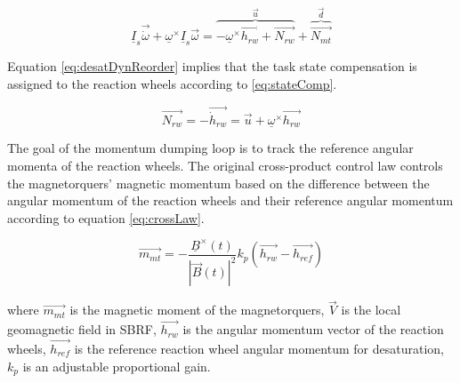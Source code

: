 \begin{equation}
\underline I_{s} \vec{\dot{\omega}} + \underline{\omega}^\times\underline I_{s} \vec{\omega} =    \overbrace{-\underline{\omega}^\times\vec{h_{rw}} + \vec{N_{rw}}}^{\vec{u}} +  \overbrace{\vec{N_{mt}}}^{\vec{d}}
\label{eq:desatDynReorder}
\end{equation}

Equation \ref{eq:desatDynReorder} implies that the task state compensation is assigned to the reaction wheels according to \ref{eq:stateComp}.

\begin{equation}
\vec{N_{rw}} = -\vec{\dot{h}_{rw}} = \vec{u} +  \underline{\omega}^\times\vec{h_{rw}}
\label{eq:stateComp}
\end{equation}


The goal of the momentum dumping loop is to track the reference angular momenta of the reaction wheels.
The original cross-product control law controls the magnetorquers' magnetic momentum based on the difference between the angular momentum of the reaction wheels and their reference angular momentum according to equation \ref{eq:crossLaw}.

\begin{equation}
\label{eq:crossLaw}
\vec{m_{mt}} = -\frac{\underline{B}^\times(t)}{|\vec{B}(t) |^2} k_p\left(\vec{h_{rw}} - \vec{h_{ref}} \right)
\end{equation}

where $\vec{m_{mt}}$ is the magnetic moment of the magnetorquers, $\vec{V}$ is the local geomagnetic field in SBRF, $\vec{h_{rw}}$ is the angular momentum vector of the reaction wheels, $\vec{h_{ref}}$ is the reference reaction wheel angular momentum for desaturation, $k_p$ is an adjustable proportional gain.
		
